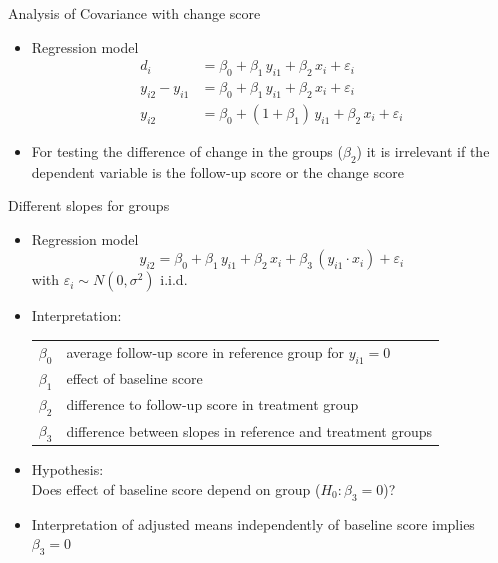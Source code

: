 \documentclass[aspectratio=169]{beamer}
\begin{document}
\begin{frame}{Analysis of Covariance with change score}
\begin{itemize}
  \item Regression model
    \begin{align*}
                  d_i &= \beta_0 + \beta_1 \, y_{i1} + \beta_2 \, x_i + \varepsilon_i \\
      y_{i2} - y_{i1} &= \beta_0 + \beta_1 \, y_{i1} + \beta_2 \, x_i + \varepsilon_i \\
               y_{i2} &= \beta_0 + (1 + \beta_1) \, y_{i1} + \beta_2 \, x_i + \varepsilon_i
    \end{align*}
  \item For testing the difference of change in the groups ($\beta_2$) it
    is irrelevant if the dependent variable is the follow-up score or the
    change score
  \vfill
\end{itemize}
\end{frame}

\begin{frame}{Different slopes for groups}
\begin{itemize}
  \item Regression model
    \[
      y_{i2} = \beta_0 + \beta_1 \, y_{i1} + \beta_2 \, x_i +
               \beta_3 \, (y_{i1} \cdot x_i) + \varepsilon_i
    \]
    with $\varepsilon_i \sim N(0, \sigma^2)$ i.i.d.
  \item Interpretation:
    \begin{tabular}{lp{10cm}}
    $\beta_0$ & average follow-up score in reference group for $y_{i1} = 0$\\
    $\beta_1$ & effect of baseline score\\
    $\beta_2$ & difference to follow-up score in treatment group\\
    $\beta_3$ & difference between slopes in reference and treatment groups
    \end{tabular}
  \item Hypothesis:\\
        Does effect of baseline score depend on group ($H_0\colon \beta_3 = 0$)?
  \item Interpretation of adjusted means independently of baseline score
    implies $\beta_3 = 0$
\end{itemize}
\end{frame}
\end{document}
